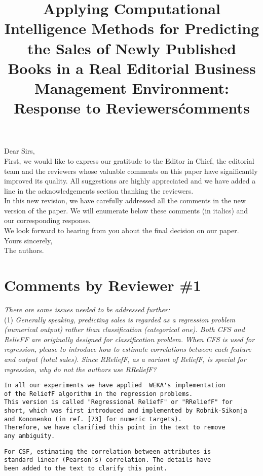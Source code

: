 \documentclass[preprint]{elsarticle}
\begin{document}

\title{Applying Computational Intelligence Methods for Predicting the Sales of Newly Published Books in a Real Editorial Business Management Environment: Response to Reviewers\' comments}

\noindent
Dear Sirs,\\

First, we would like to express our gratitude to the Editor in Chief,
the editorial team and the reviewers whose valuable comments on this
paper have significantly improved its quality. All suggestions are
highly appreciated and we have added a line in the acknowledgements
section thanking the reviewers. \\ 

In this new revision, we have carefully addressed all the comments in
the new version of the paper. We will enumerate below these comments
(in italics) and our corresponding response. \\ 

We look forward to hearing from you about the final decision on our paper. \\

\noindent
Yours sincerely,\\
The authors.


\section{Comments by Reviewer \#1}

\noindent \emph{There are some issues needed to be addressed further:} \\

\noindent (1) \emph{Generally speaking, predicting sales is regarded as a regression problem (numerical output) rather than classification (categorical one). Both CFS and RelieFF are originally designed for classification problem. When CFS is used for regression, please to introduce how to estimate correlations between each feature and output (total sales). Since RReliefF, as a variant of ReliefF, is special for regression, why do not the authors use RReliefF? } 

\begin{verbatim}
In all our experiments we have applied  WEKA's implementation 
of the ReliefF algorithm in the regression problems. 
This version is called "Regressional ReliefF" or "RReliefF" for 
short, which was first introduced and implemented by Robnik-Sikonja 
and Kononenko (in ref. [73] for numeric targets). 
Therefore, we have clarified this point in the text to remove 
any ambiguity.
\end{verbatim}
\begin{verbatim}
For CSF, estimating the correlation between attributes is 
standard linear (Pearson's) correlation. The details have 
been added to the text to clarify this point.
\end{verbatim}
\end{document}
